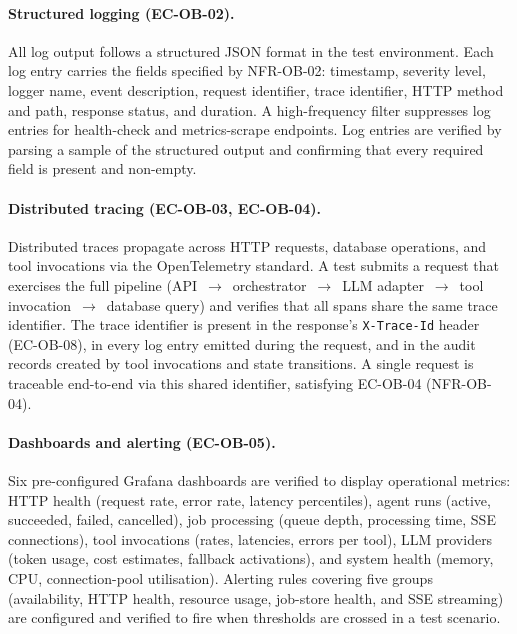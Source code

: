 \documentclass[a4paper,noexaminfo]{sapthesis}
\begin{document}
\paragraph{Structured logging (EC-OB-02).}
All log output follows a structured JSON format in the test environment.
Each log entry carries the fields specified by NFR-OB-02: timestamp,
severity level, logger name, event description, request identifier, trace
identifier, HTTP method and path, response status, and duration.  A
high-frequency filter suppresses log entries for health-check and
metrics-scrape endpoints.  Log entries are verified by parsing a sample
of the structured output and confirming that every required field is
present and non-empty.

\paragraph{Distributed tracing (EC-OB-03, EC-OB-04).}
Distributed traces propagate across HTTP requests, database operations,
and tool invocations via the OpenTelemetry standard.  A test submits a
request that exercises the full pipeline (API~$\to$~orchestrator~$\to$~LLM
adapter~$\to$~tool invocation~$\to$~database query) and verifies that all
spans share the same trace identifier.  The trace identifier is present
in the response's \texttt{X-Trace-Id} header (EC-OB-08), in every log
entry emitted during the request, and in the audit records created by
tool invocations and state transitions.  A single request is traceable
end-to-end via this shared identifier, satisfying EC-OB-04 (NFR-OB-04).

\paragraph{Dashboards and alerting (EC-OB-05).}
Six pre-configured Grafana dashboards are verified to display operational
metrics: HTTP health (request rate, error rate, latency percentiles),
agent runs (active, succeeded, failed, cancelled), job processing
(queue depth, processing time, SSE connections), tool invocations
(rates, latencies, errors per tool), LLM providers (token usage, cost
estimates, fallback activations), and system health (memory, CPU,
connection-pool utilisation).  Alerting rules covering five groups
(availability, HTTP health, resource usage, job-store health, and SSE
streaming) are configured and verified to fire when thresholds are
crossed in a test scenario.
\end{document}
